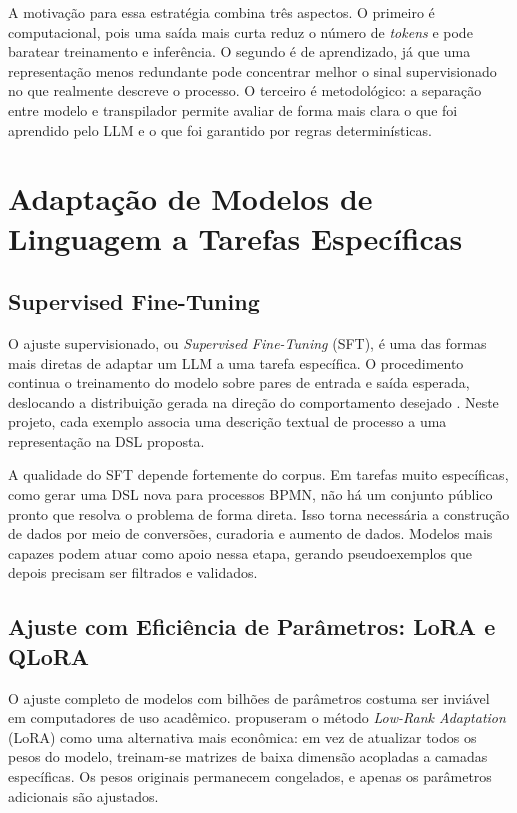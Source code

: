 A motivação para essa estratégia combina três aspectos. O primeiro é computacional, pois uma saída mais curta reduz o número de \textit{tokens} e pode baratear treinamento e inferência. O segundo é de aprendizado, já que uma representação menos redundante pode concentrar melhor o sinal supervisionado no que realmente descreve o processo. O terceiro é metodológico: a separação entre modelo e transpilador permite avaliar de forma mais clara o que foi aprendido pelo LLM e o que foi garantido por regras determinísticas.

\section{Adaptação de Modelos de Linguagem a Tarefas Específicas}
\label{sec:adaptacao}

\subsection{Supervised Fine-Tuning}
\label{subsec:sft}

O ajuste supervisionado, ou \textit{Supervised Fine-Tuning} (SFT), é uma das formas mais diretas de adaptar um LLM a uma tarefa específica. O procedimento continua o treinamento do modelo sobre pares de entrada e saída esperada, deslocando a distribuição gerada na direção do comportamento desejado \cite{ouyang2022training}. Neste projeto, cada exemplo associa uma descrição textual de processo a uma representação na DSL proposta.

A qualidade do SFT depende fortemente do corpus. Em tarefas muito específicas, como gerar uma DSL nova para processos BPMN, não há um conjunto público pronto que resolva o problema de forma direta. Isso torna necessária a construção de dados por meio de conversões, curadoria e aumento de dados. Modelos mais capazes podem atuar como apoio nessa etapa, gerando pseudoexemplos que depois precisam ser filtrados e validados.

\subsection{Ajuste com Eficiência de Parâmetros: LoRA e QLoRA}
\label{subsec:lora}

O ajuste completo de modelos com bilhões de parâmetros costuma ser inviável em computadores de uso acadêmico.  propuseram o método \textit{Low-Rank Adaptation} (LoRA) como uma alternativa mais econômica: em vez de atualizar todos os pesos do modelo, treinam-se matrizes de baixa dimensão acopladas a camadas específicas. Os pesos originais permanecem congelados, e apenas os parâmetros adicionais são ajustados.

